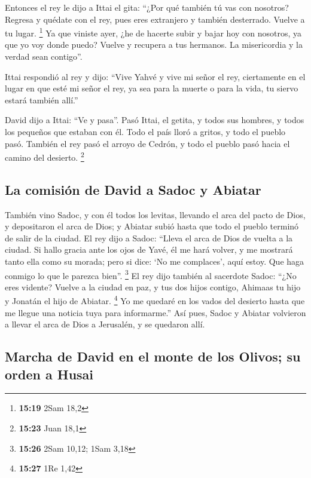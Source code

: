 \begin{paracol}{2}
 Entonces el rey le dijo a Ittai el gita: ``¿Por qué
también tú vas con nosotros? Regresa y quédate con el rey, pues eres
extranjero y también desterrado. Vuelve a tu lugar. \footnote{\textbf{15:19}
  2Sam 18,2}  Ya que viniste ayer, ¿he de hacerte subir y
bajar hoy con nosotros, ya que yo voy donde puedo? Vuelve y recupera a
tus hermanos. La misericordia y la verdad sean contigo''.

 Ittai respondió al rey y dijo: ``Vive Yahvé y vive mi
señor el rey, ciertamente en el lugar en que esté mi señor el rey, ya
sea para la muerte o para la vida, tu siervo estará también allí.''

 David dijo a Ittai: ``Ve y pasa''. Pasó Ittai, el
getita, y todos sus hombres, y todos los pequeños que estaban con él.
 Todo el país lloró a gritos, y todo el pueblo pasó.
También el rey pasó el arroyo de Cedrón, y todo el pueblo pasó hacia el
camino del desierto. \footnote{\textbf{15:23} Juan 18,1}

\hypertarget{la-comisiuxf3n-de-david-a-sadoc-y-abiatar}{%
\subsection{La comisión de David a Sadoc y
Abiatar}\label{la-comisiuxf3n-de-david-a-sadoc-y-abiatar}}

 También vino Sadoc, y con él todos los levitas, llevando
el arca del pacto de Dios, y depositaron el arca de Dios; y Abiatar
subió hasta que todo el pueblo terminó de salir de la ciudad.
 El rey dijo a Sadoc: ``Lleva el arca de Dios de vuelta a
la ciudad. Si hallo gracia ante los ojos de Yavé, él me hará volver, y
me mostrará tanto ella como su morada;  pero si dice: `No
me complaces', aquí estoy. Que haga conmigo lo que le parezca bien''.
\footnote{\textbf{15:26} 2Sam 10,12; 1Sam 3,18}  El rey
dijo también al sacerdote Sadoc: ``¿No eres vidente? Vuelve a la ciudad
en paz, y tus dos hijos contigo, Ahimaas tu hijo y Jonatán el hijo de
Abiatar. \footnote{\textbf{15:27} 1Re 1,42}  Yo me
quedaré en los vados del desierto hasta que me llegue una noticia tuya
para informarme.''  Así pues, Sadoc y Abiatar volvieron a
llevar el arca de Dios a Jerusalén, y se quedaron allí.

\hypertarget{marcha-de-david-en-el-monte-de-los-olivos-su-orden-a-husai}{%
\subsection{Marcha de David en el monte de los Olivos; su orden a
Husai}\label{marcha-de-david-en-el-monte-de-los-olivos-su-orden-a-husai}}


\end{paracol}
